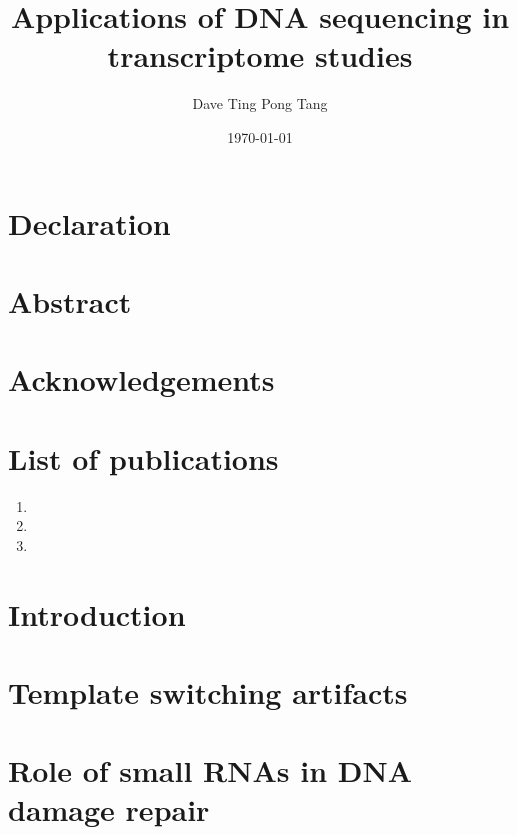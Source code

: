\documentclass[12pt,a4paper]{report}
\begin{document}
%

\title{
   {Applications of DNA sequencing in transcriptome studies}
}

\author{Dave Ting Pong Tang}
\date{\today}
\maketitle

\chapter*{Declaration}


\chapter*{Abstract}


\chapter*{Acknowledgements}


\chapter*{List of publications}

\begin{enumerate}
\item {}
\item {}
\item {}
\end{enumerate}

\tableofcontents

\listoffigures



\chapter{Introduction}


\chapter{Template switching artifacts}



\chapter{Role of small RNAs in DNA damage repair}


\end{document}
